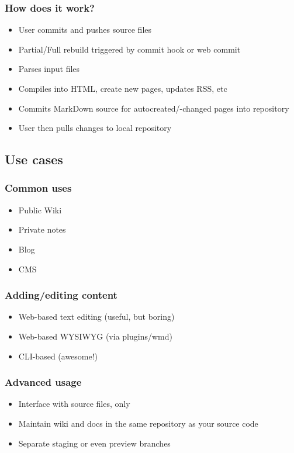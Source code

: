 \documentclass[t]{beamer}
\begin{document}
\begin{frame}
	\frametitle{How does it work?}
	\begin{itemize}
		\item User commits and pushes source files
		\item Partial/Full rebuild triggered by commit hook or web commit
		\item Parses input files
		\item Compiles into HTML, create new pages, updates RSS, etc
		\item Commits MarkDown source for autocreated/-changed pages into repository
		\item User then pulls changes to local repository
	\end{itemize}
\end{frame}

\subsection{Use cases}

\begin{frame}
	\frametitle{Common uses}
	\begin{itemize}
		\item Public Wiki
		\item Private notes
		\item Blog
		\item CMS
	\end{itemize}
\end{frame}

\begin{frame}
	\frametitle{Adding/editing content}
	\begin{itemize}
		\item Web-based text editing (useful, but boring)
		\item Web-based WYSIWYG (via plugins/wmd)
		\item CLI-based (awesome!)
	\end{itemize}
\end{frame}

\begin{frame}
	\frametitle{Advanced usage}
	\begin{itemize}
		\item Interface with source files, only
		\item Maintain wiki and docs in the same repository as your source code
		\item Separate staging or even preview branches
	\end{itemize}
\end{frame}
\end{document}
